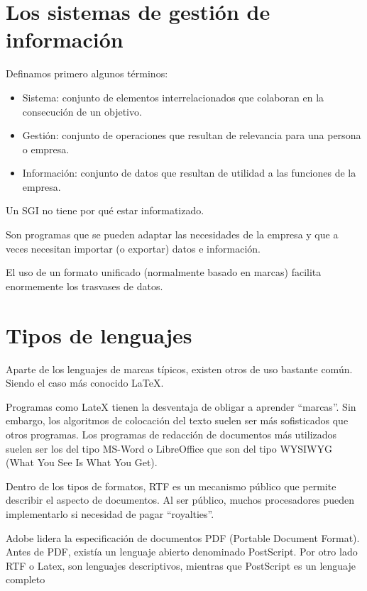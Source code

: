 \documentclass[letterpaper,10pt,spanish]{sphinxmanual}
\begin{document}
\section{Los sistemas de gestión de información}
\label{\detokenize{tema1:los-sistemas-de-gestion-de-informacion}}
Definamos primero algunos términos:
\begin{itemize}
\item {} 
Sistema: conjunto de elementos interrelacionados que colaboran en la consecución de un objetivo.

\item {} 
Gestión: conjunto de operaciones que resultan de relevancia para una persona o empresa.

\item {} 
Información: conjunto de datos que resultan de utilidad a las funciones de la empresa.

\end{itemize}

Un SGI no tiene por qué estar informatizado.

Son programas que se pueden adaptar las necesidades de la empresa y que a veces necesitan
importar (o exportar) datos e información.

El uso de un formato unificado (normalmente basado en marcas) facilita enormemente los
trasvases de datos.


\section{Tipos de lenguajes}
\label{\detokenize{tema1:tipos-de-lenguajes}}
Aparte de los lenguajes de marcas típicos, existen otros de uso bastante común. Siendo el caso más conocido LaTeX.

Programas como LateX tienen la desventaja de obligar a aprender “marcas”. Sin embargo, los algoritmos de colocación del texto suelen ser más sofisticados que otros programas. Los programas de redacción de documentos más utilizados suelen ser los del tipo MS-Word o LibreOffice que son del tipo WYSIWYG (What You See Is What You Get).

Dentro de los tipos de formatos, RTF es un mecanismo público que permite describir el aspecto de documentos. Al ser público, muchos procesadores pueden implementarlo si necesidad de pagar “royalties”.

Adobe lidera la especificación de documentos PDF (Portable Document Format). Antes de
PDF, existía un lenguaje abierto denominado PostScript. Por otro lado RTF o Latex, son lenguajes descriptivos, mientras que PostScript es un lenguaje completo
\end{document}
